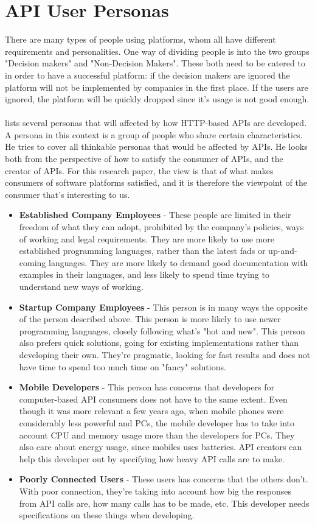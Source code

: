 \documentclass{cslthse-msc}
\begin{document}
    \section{API User Personas}
    There are many types of people using platforms, whom all have different
    requirements and personalities. One way of dividing people is into the two groups
    "Decision makers" and "Non-Decision Makers". These both need to be catered to in order
    to have a successful platform: if the decision makers are ignored the
    platform will not be implemented by companies in the first place. If the
    users are ignored, the platform will be quickly dropped since it's usage
    is not good enough.
    \\ \\
    \citet{personas} lists several personas that will affected by how HTTP-based APIs are developed. A persona in this context is a group of people who share certain characteristics. He tries to cover all thinkable personas that would be affected by APIs. He looks both from the perspective of how to satisfy the consumer of APIs, and the creator of APIs. For this research paper, the view is that of what makes consumers of software platforms satisfied, and it is therefore the viewpoint of the consumer that's interesting to us.
    \begin{itemize}[label={}]
        \item \textbf{Established Company Employees} - These people are limited in their freedom of what they can adopt, prohibited by the company's policies, ways of working and legal requirements. They are more likely to use more established programming languages, rather than the latest fads or up-and-coming languages. They are more likely to demand good documentation with examples in their languages, and less likely to spend time trying to understand new ways of working.
        \item \textbf{Startup Company Employees} - This person is in many ways the opposite of the person described above. This person is more likely to use newer programming languages, closely following what's "hot and new". This person also prefers quick solutions, going for existing implementations rather than developing their own. They're pragmatic, looking for fast results and does not have time to spend too much time on "fancy" solutions.
        \item \textbf{Mobile Developers} - This person has concerns that developers for computer-based API consumers does not have to the same extent. Even though it was more relevant a few years ago, when mobile phones were considerably less powerful and PCs, the mobile developer has to take into account CPU and memory usage more than the developers for PCs. They also care about energy usage, since mobiles uses batteries. API creators can help this developer out by specifying how heavy API calls are to make.
        \item \textbf{Poorly Connected Users} - These users has concerns that the others don't. With poor connection, they're taking into account how big the responses from API calls are, how many calls has to be made, etc. This developer needs specifications on these things when developing.
    \end{itemize}
\end{document}

